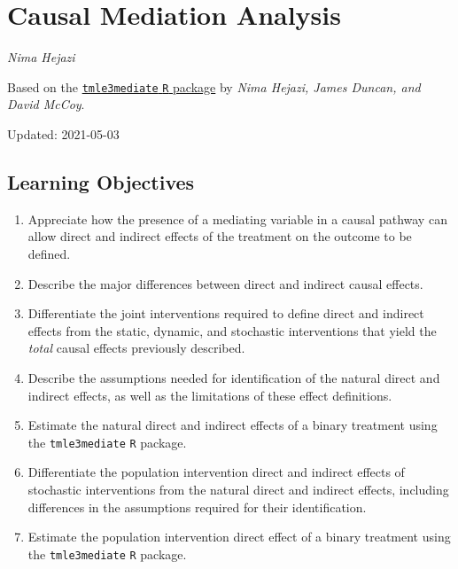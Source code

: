 \documentclass[12pt, krantz2,]{krantz}
\newcommand{\passthrough}[1]{#1}
\providecommand{\tightlist}{%
  \setlength{\itemsep}{0pt}\setlength{\parskip}{0pt}}
\theoremstyle{definition}
\theoremstyle{definition}
\theoremstyle{definition}
\newcommand{\1}{\mathbbm{1}}
\begin{document}
\hypertarget{causal-mediation-analysis}{%
\chapter{Causal Mediation Analysis}\label{causal-mediation-analysis}}

\emph{Nima Hejazi}

Based on the \href{https://github.com/tlverse/tmle3mediate}{\passthrough{\lstinline!tmle3mediate!} \passthrough{\lstinline!R!}
package} by \emph{Nima Hejazi, James
Duncan, and David McCoy}.

Updated: 2021-05-03

\hypertarget{learning-objectives-5}{%
\section{Learning Objectives}\label{learning-objectives-5}}

\begin{enumerate}
\def\labelenumi{\arabic{enumi}.}
\tightlist
\item
  Appreciate how the presence of a mediating variable in a causal pathway can
  allow direct and indirect effects of the treatment on the outcome to be
  defined.
\item
  Describe the major differences between direct and indirect causal effects.
\item
  Differentiate the joint interventions required to define direct and indirect
  effects from the static, dynamic, and stochastic interventions that yield
  the \emph{total} causal effects previously described.
\item
  Describe the assumptions needed for identification of the natural direct and
  indirect effects, as well as the limitations of these effect definitions.
\item
  Estimate the natural direct and indirect effects of a binary treatment using
  the \passthrough{\lstinline!tmle3mediate!} \passthrough{\lstinline!R!} package.
\item
  Differentiate the population intervention direct and indirect effects of
  stochastic interventions from the natural direct and indirect effects,
  including differences in the assumptions required for their identification.
\item
  Estimate the population intervention direct effect of a binary treatment
  using the \passthrough{\lstinline!tmle3mediate!} \passthrough{\lstinline!R!} package.
\end{enumerate}
\end{document}
